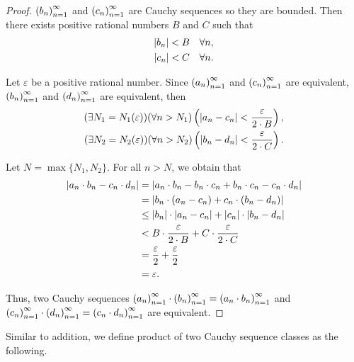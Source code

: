 \begin{proof}
    ${\left({b_{n}}\right)}^{\infty}_{n=1}$  and ${\left({c_{n}}\right)}^{\infty}_{n=1}$ are Cauchy sequences so they are bounded. Then there exists positive rational numbers $B$ and $C$ such that
    \[
        \begin{split}
            \left\vert{b_{n}}\right\vert < B\quad\forall n, \\
            \left\vert{c_{n}}\right\vert < C\quad\forall n.
        \end{split}
    \]

    Let $\varepsilon$ be a positive rational number. Since ${\left({a_{n}}\right)}^{\infty}_{n=1}$ and ${\left({c_{n}}\right)}^{\infty}_{n=1}$ are equivalent, ${\left({b_{n}}\right)}^{\infty}_{n=1}$ and ${\left({d_{n}}\right)}^{\infty}_{n=1}$ are equivalent, then
    \[
        \begin{split}
            (\exists N_{1}=N_{1}(\varepsilon))(\forall n > N_{1})\left(\left\vert{a_{n} - c_{n}}\right\vert < \frac{\varepsilon}{2\cdot B}\right), \\
            (\exists N_{2}=N_{2}(\varepsilon))(\forall n > N_{2})\left(\left\vert{b_{n} - d_{n}}\right\vert < \frac{\varepsilon}{2\cdot C}\right).
        \end{split}
    \]

    Let $N = \max\{ N_{1}, N_{2} \}$. For all $n > N$, we obtain that
    \begin{align*}
        \left\vert{a_{n}\cdot b_{n} - c_{n}\cdot d_{n}}\right\vert & = \left\vert{a_{n}\cdot b_{n} - b_{n}\cdot c_{n} + b_{n}\cdot c_{n} - c_{n}\cdot d_{n}}\right\vert \\
                                                  & = \left\vert{b_{n}\cdot (a_{n} - c_{n}) + c_{n}\cdot (b_{n} - d_{n})}\right\vert                   \\
                                                  & \le \left\vert{b_{n}}\right\vert\cdot\left\vert{a_{n} - c_{n}}\right\vert + \left\vert{c_{n}}\right\vert\cdot\left\vert{b_{n} - d_{n}}\right\vert     \\
                                                  & < B\cdot\frac{\varepsilon}{2\cdot B} + C\cdot\frac{\varepsilon}{2\cdot C}         \\
                                                  & = \frac{\varepsilon}{2} + \frac{\varepsilon}{2}                                   \\
                                                  & = \varepsilon.
    \end{align*}

    Thus, two Cauchy sequences ${\left({a_{n}}\right)}^{\infty}_{n=1}\cdot{\left({b_{n}}\right)}^{\infty}_{n=1} = {\left({a_{n}\cdot b_{n}}\right)}^{\infty}_{n=1}$ and ${\left({c_{n}}\right)}^{\infty}_{n=1}\cdot{\left({d_{n}}\right)}^{\infty}_{n=1} = {\left({c_{n}\cdot d_{n}}\right)}^{\infty}_{n=1}$ are equivalent.
\end{proof}

Similar to addition, we define product of two Cauchy sequence classes as the following.


